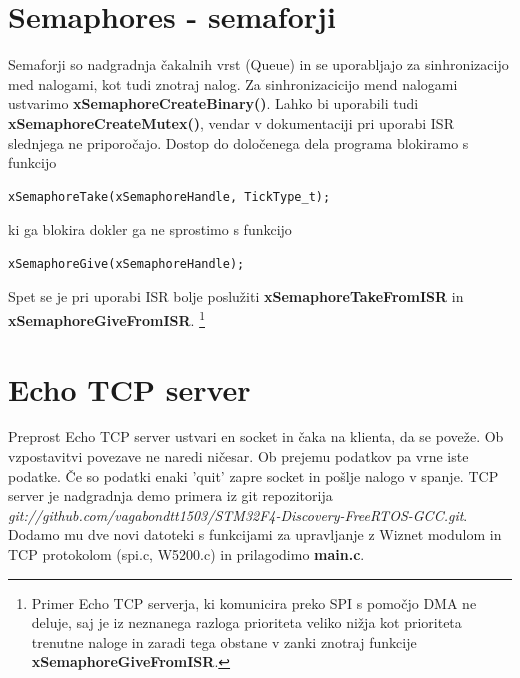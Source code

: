 \documentclass[12pt]{article}
\begin{document}
\section{Semaphores - semaforji}
Semaforji so nadgradnja čakalnih vrst (Queue) in se uporabljajo za sinhronizacijo med nalogami, kot tudi znotraj nalog. Za sinhronizacicijo mend nalogami  ustvarimo \textbf{xSemaphoreCreateBinary()}. Lahko bi uporabili tudi \textbf{xSemaphoreCreateMutex()}, vendar v dokumentaciji pri uporabi ISR slednjega ne priporočajo. Dostop do določenega dela programa blokiramo s funkcijo
\begin{lstlisting}[frame = single ]
xSemaphoreTake(xSemaphoreHandle, TickType_t);	
\end{lstlisting}
ki ga blokira dokler ga ne sprostimo s funkcijo 
\begin{lstlisting}[frame = single ]
xSemaphoreGive(xSemaphoreHandle);	
\end{lstlisting}
Spet se je pri uporabi ISR bolje poslužiti \textbf{xSemaphoreTakeFromISR} in \textbf{xSemaphoreGiveFromISR}. \footnote{Primer Echo TCP serverja, ki komunicira preko SPI s pomočjo DMA ne deluje, saj je iz neznanega razloga prioriteta veliko nižja kot prioriteta trenutne naloge in zaradi tega obstane v zanki znotraj funkcije \textbf{xSemaphoreGiveFromISR}.}
\section{ Echo TCP server }
Preprost Echo TCP server ustvari en socket in čaka na klienta, da se poveže. Ob vzpostavitvi povezave ne naredi ničesar. Ob prejemu podatkov pa vrne iste podatke. Če so podatki enaki 'quit' zapre socket in pošlje nalogo v spanje. TCP server je nadgradnja demo primera iz git repozitorija \\
 \textit{git://github.com/vagabondtt1503/STM32F4-Discovery-FreeRTOS-GCC.git}. Dodamo mu  dve novi datoteki s funkcijami za upravljanje z Wiznet modulom in TCP protokolom (spi.c, W5200.c) in prilagodimo \textbf{main.c}.  
\end{document}
